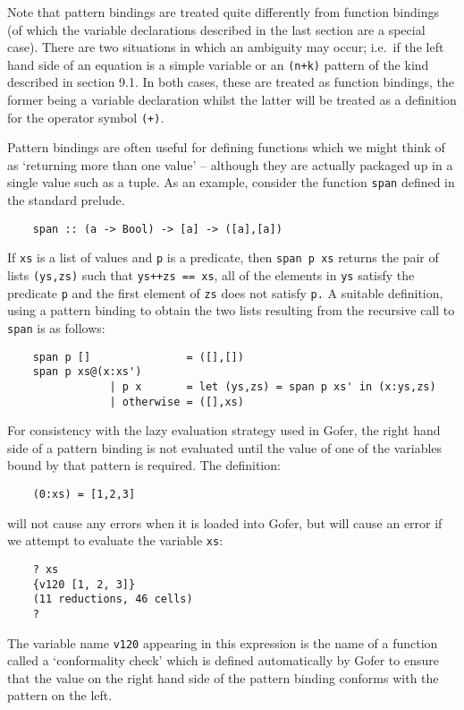 Note that pattern bindings are treated quite  differently  from
function bindings (of which the variable declarations described in  the
last section are a special case).  There are two situations in which an
ambiguity may occur; i.e.\ if the left hand side of  an  equation  is  a
simple variable or an \verb"(n+k)" pattern of the kind  described  in  section
9.1.  In both cases, these are treated as function bindings, the former
being a variable declaration whilst the latter will  be  treated  as  a
definition for the operator symbol \verb"(+)".

Pattern bindings are often useful for defining functions which we might
think of as `returning more  than  one  value'  --  although  they  are
actually packaged up in a single value such as a tuple.  As an example,
consider the function \verb"span" defined in the standard prelude.
\begin{verbatim}
    span :: (a -> Bool) -> [a] -> ([a],[a])
\end{verbatim}
If \verb"xs" is a list of values and \verb"p"
is a predicate, then \verb"span p xs"  returns
the pair of lists \verb"(ys,zs)" such that \verb"ys++zs == xs", 
all of  the  elements
in \verb"ys" satisfy the predicate \verb"p" 
and the first  element  of  \verb"zs" does  not
satisfy \verb"p." A suitable definition, using a pattern  binding  to  obtain
the two lists resulting  from  the  recursive  call  to  \verb"span"  is  as
follows:
\begin{verbatim}
    span p []               = ([],[])
    span p xs@(x:xs')
                | p x       = let (ys,zs) = span p xs' in (x:ys,zs)
                | otherwise = ([],xs)
\end{verbatim}
For consistency with the lazy evaluation strategy used  in  Gofer,  the
right hand side of a pattern binding is not evaluated until  the  value
of one of the  variables  bound  by  that  pattern  is  required.   The
definition:
\begin{verbatim}
    (0:xs) = [1,2,3]
\end{verbatim}
will not cause any errors when it is loaded into Gofer, but will  cause
an error if we attempt to evaluate the variable \verb"xs":
\begin{verbatim}
    ? xs
    {v120 [1, 2, 3]}
    (11 reductions, 46 cells)
    ?
\end{verbatim}
The variable name \verb"v120" appearing in this expression is the name of  a
function called a `conformality check' which is  defined  automatically
by Gofer to ensure that the value on the right hand side of the pattern
binding conforms with the pattern on the left.

